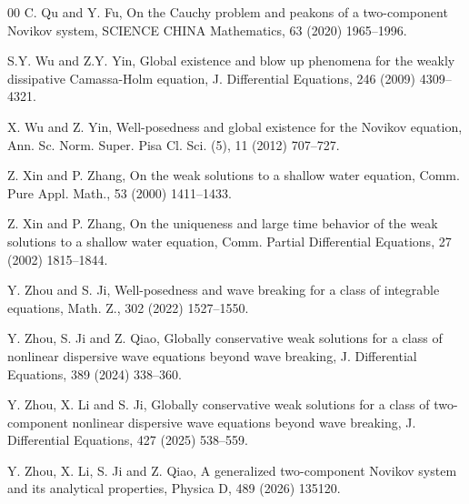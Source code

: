 \documentclass[preprint,12pt]{elsarticle}
\numberwithin{equation}{section}
\begin{document}
\begin{thebibliography}{00}
 C. Qu and Y. Fu, On the Cauchy problem and peakons of a two-component Novikov system, SCIENCE CHINA Mathematics, 63 (2020) 1965--1996.


 S.Y. Wu and Z.Y. Yin, Global existence and blow up phenomena for the weakly dissipative Camassa-Holm equation, J. Differential Equations, 246 (2009) 4309--4321.

 X. Wu and Z. Yin, Well-posedness and global existence for the Novikov equation, Ann. Sc. Norm. Super. Pisa Cl. Sci. (5), 11 (2012) 707--727.

 Z. Xin and P. Zhang, On the weak solutions to a shallow water equation, Comm. Pure Appl. Math., 53 (2000) 1411--1433.

 Z. Xin and P. Zhang, On the uniqueness and large time behavior of the weak solutions to a shallow water equation, Comm. Partial Differential Equations, 27 (2002) 1815--1844.



 Y. Zhou and S. Ji, Well-posedness and wave breaking for a class of integrable equations, Math. Z., 302 (2022) 1527--1550.

 Y. Zhou, S. Ji and Z. Qiao, Globally conservative weak solutions for a class of nonlinear dispersive wave equations beyond wave breaking, J. Differential Equations, 389 (2024) 338--360.

 Y. Zhou, X. Li and S. Ji, Globally conservative weak solutions for a class of two-component nonlinear dispersive wave equations beyond wave breaking, J. Differential Equations, 427 (2025) 538--559.

 Y. Zhou, X. Li, S. Ji and Z. Qiao, A generalized two-component Novikov system and its analytical properties, Physica D, 489 (2026) 135120.
\end{thebibliography}
\end{document}
